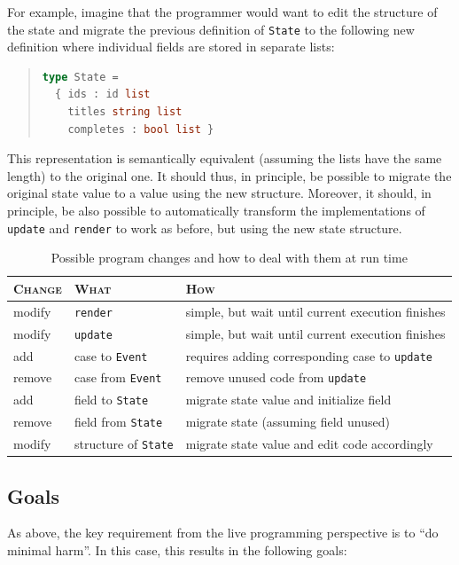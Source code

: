 \documentclass[english,submission]{programming}
\begin{document}
For example, imagine that the programmer would want to edit the structure of the state and migrate the previous definition of \texttt{State} to the following new definition where individual fields are stored in separate lists:

\begin{quote}
\begin{lstlisting}[language=ml,morekeywords={on}]
type State =
  { ids : id list
    titles string list
    completes : bool list }
\end{lstlisting}
\end{quote}

This representation is semantically equivalent (assuming the lists have the same length) to the original one. It should thus, in principle, be possible to migrate the original state value to a value using the new structure. Moreover, it should, in principle, be also possible to automatically transform the implementations of \texttt{update} and \texttt{render} to work as before, but using the new state structure.

\begin{table}[t]
  \centering
\begin{tabular}{lll}\toprule
\textsc{Change} & \textsc{What} & \textsc{How}\\\midrule
modify & \texttt{render} & simple, but wait until current execution finishes  \\
modify & \texttt{update} & simple, but wait until current execution finishes  \\
add & case to \texttt{Event} & requires adding corresponding case to \texttt{update} \\
remove & case from \texttt{Event} & remove unused code from \texttt{update} \\
add & field to \texttt{State} & migrate state value and initialize field \\
remove & field from \texttt{State} & migrate state (assuming field unused) \\
modify & structure of \texttt{State} & migrate state value and edit code accordingly \\
\bottomrule
\end{tabular}
\caption{Possible program changes and how to deal with them at run time}
\label{TBL:elmchanges}
\end{table}


\subsection{Goals}
As above, the key requirement from the live programming perspective is to ``do minimal harm''. In this case, this results in the following goals:
\end{document}
